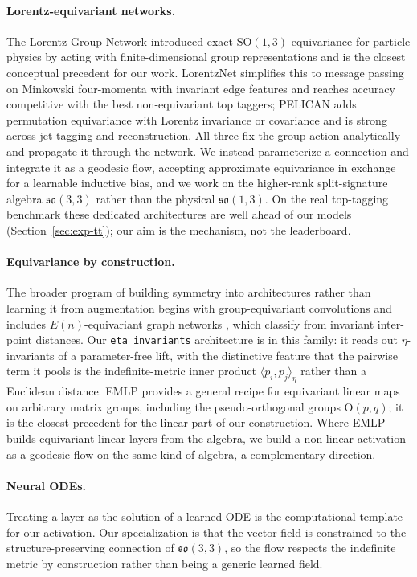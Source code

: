 \documentclass[11pt]{article}
\begin{document}
\paragraph{Lorentz-equivariant networks.}
The Lorentz Group Network \citep{bogatskiy2020lgn} introduced exact
$\mathrm{SO}(1,3)$ equivariance for particle physics by acting with
finite-dimensional group representations and is the closest conceptual
precedent for our work. LorentzNet \citep{gong2022lorentznet} simplifies
this to message passing on Minkowski four-momenta with invariant edge
features and reaches accuracy competitive with the best non-equivariant
top taggers; PELICAN \citep{bogatskiy2022pelican} adds permutation
equivariance with Lorentz invariance or covariance and is strong across
jet tagging and reconstruction. All three fix the group action
analytically and propagate it through the network. We instead
parameterize a connection and integrate it as a geodesic flow, accepting
approximate equivariance in exchange for a learnable inductive bias, and
we work on the higher-rank split-signature algebra $\mathfrak{so}(3,3)$
rather than the physical $\mathfrak{so}(1,3)$. On the real top-tagging
benchmark these dedicated architectures are well ahead of our models
(Section~\ref{sec:exp-tt}); our aim is the mechanism, not the
leaderboard.

\paragraph{Equivariance by construction.}
The broader program of building symmetry into architectures rather than
learning it from augmentation begins with group-equivariant
convolutions \citep{cohen2016gconv} and includes $E(n)$-equivariant
graph networks \citep{satorras2021egnn}, which classify from invariant
inter-point distances. Our \texttt{eta\_invariants} architecture is in
this family: it reads out $\eta$-invariants of a parameter-free lift,
with the distinctive feature that the pairwise term it pools is the
indefinite-metric inner product $\langle p_i, p_j\rangle_\eta$ rather
than a Euclidean distance. EMLP \citep{finzi2021emlp} provides a general
recipe for equivariant linear maps on arbitrary matrix groups, including
the pseudo-orthogonal groups $\mathrm{O}(p,q)$; it is the closest
precedent for the linear part of our construction. Where EMLP builds
equivariant linear layers from the algebra, we build a non-linear
activation as a geodesic flow on the same kind of algebra, a
complementary direction.

\paragraph{Neural ODEs.}
Treating a layer as the solution of a learned ODE
\citep{chen2018neuralode} is the computational template for our
activation. Our specialization is that the vector field is constrained
to the structure-preserving connection of $\mathfrak{so}(3,3)$, so the
flow respects the indefinite metric by construction rather than being a
generic learned field.
\end{document}
